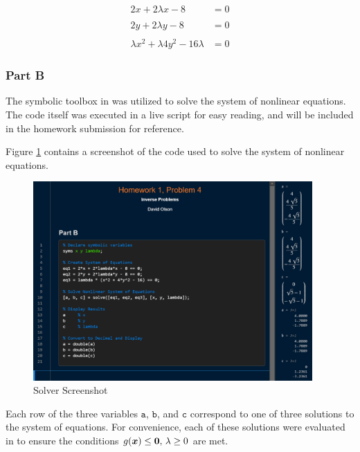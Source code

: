 \begin{align*}
	2x + 2 \lambda x - 8 &= 0 \\
	\\
	2y + 2 \lambda y - 8 &= 0 \\
	\\
	\lambda x^2 + \lambda 4 y^2 - 16 \lambda &= 0 
\end{align*}


\subsubsection{Part B}

The symbolic toolbox in \MATLAB was utilized to solve the system of nonlinear equations. The code itself was executed in a live script for easy reading, and will be included in the homework submission for reference. 

Figure \ref{fig: matlab solver screenshot} contains a screenshot of the \MATLAB code used to solve the system of nonlinear equations. 

\begin{figure}[h] \label{fig: matlab solver screenshot}
	\centering
	\includegraphics[width=0.95\textwidth]{./images/prob4_solver_screenshot.png}
	\caption{\MATLAB Solver Screenshot}
\end{figure}
\FloatBarrier

Each row of the three variables $\texttt{a}$, $\texttt{b}$, and $\texttt{c}$ correspond to one of three solutions to the system of equations. For convenience, each of these solutions were evaluated in \MATLAB to ensure the conditions $g(\boldsymbol{x}) \leq \boldsymbol{0}, \, \lambda \geq 0$ are met.

